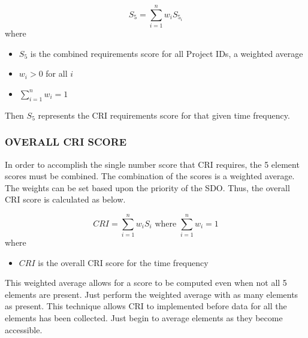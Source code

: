\documentclass[SDSUThesis.tex]{subfiles}
\begin{document}
                \[
                    S_{5} = \sum\limits^n_{i=1} w_i S_{5_i} 
                \]
                where
                \begin{itemize}
                    \item $S_5$ is the combined requirements score for all Project IDs, 
                    a weighted average
                    \item $w_i > 0$ for all $i$
                    \item $\sum\limits^n_{i=1} w_i = 1$
                \end{itemize}
                
                Then $S_5$ represents the CRI requirements score for that given time 
                frequency.
                
        \subsubsection{OVERALL CRI SCORE}
            In order to accomplish the single number score that CRI requires,
            the 5 element scores must be combined. The combination of the scores
            is a weighted average.  The weights can be set based upon the 
            priority of the SDO.  Thus, the overall CRI score is calculated as below.
            
            \[
                CRI =\sum\limits^n_{i=1} w_i S_i 
                    \text{ where } \sum\limits^n_{i=1} w_i = 1
            \]
            where
            \begin{itemize}
                \item $CRI$ is the overall CRI score for the time frequency
            \end{itemize}
            
            This weighted average allows for a score to be computed even when not
            all 5 elements are present. Just perform the weighted average with
            as many elements as present.  This technique allows CRI to implemented
            before data for all the elements has been collected.  Just begin
            to average elements as they become accessible.
\end{document}

